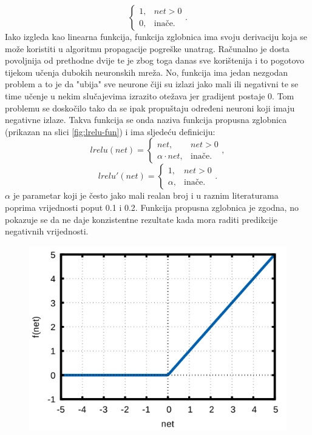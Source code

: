\documentclass[times, utf8, zavrsni]{fer}
\begin{document}
\begin{enumerate}
\begin{equation}
\begin{cases}
            1, & net > 0\\
            0, & \text{inače}.
        \end{cases}
        .
    \end{equation}
    Iako izgleda kao linearna funkcija, funkcija zglobnica ima svoju derivaciju koja se može koristiti u algoritmu propagacije pogreške unatrag. Računalno je dosta povoljnija od prethodne dvije te je zbog toga danas sve korištenija i to pogotovo tijekom učenja dubokih neuronskih mreža. No, funkcija ima jedan nezgodan problem a to je da "ubija" sve neurone čiji su izlazi jako mali ili negativni te se time učenje u nekim slučajevima izrazito otežava jer gradijent postaje 0. Tom problemu se doskočilo tako da se ipak propuštaju određeni neuroni koji imaju negativne izlaze. Takva funkcija se onda naziva funkcija propusna zglobnica  (prikazan na slici \ref{fig:lrelu-fun}) i ima sljedeću definiciju:
    \begin{equation}
        \label{eq:lrelu}
        lrelu(net) = 
        \begin{cases}
            net, & net > 0\\
            \alpha \cdot net, & \text{inače}.
        \end{cases}
        ,
    \end{equation}
    \begin{equation}
        \label{eq:lrelu-der}
        lrelu'(net) =
        \begin{cases}
            1, & net > 0\\
            \alpha, & \text{inače}.
        \end{cases}
        .
    \end{equation}
    $\alpha$ je parametar koji je često jako mali realan broj i u raznim literaturama poprima vrijednosti poput 0.1 i 0.2. Funkcija propusna zglobnica je zgodna, no pokazuje se da ne daje konzistentne rezultate kada mora raditi predikcije negativnih vrijednosti.
    \begin{figure}[H]
        \centering
        \includegraphics[scale=0.55]{img/relu-fun.png}

\end{figure}
\end{enumerate}
\end{document}
